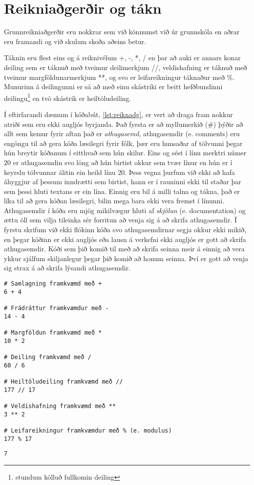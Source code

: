 \section{Reikniaðgerðir og tákn}\label{uk:tolur-reiknivirkjar}
Grunnreikniaðgerðir eru nokkrar sem við könnumst við úr grunnskóla en aðrar eru framandi og við skulum skoða aðeins betur.

Táknin eru flest eins og á reiknivélum +, -, *, / en þar að auki er annars konar deiling sem er táknuð með tveimur deilimerkjum //, veldishafning er táknuð með tveimur margföldunarmerkjum **, og svo er leifareikningur táknaður með \%.
Munurinn á deilingunni er sá að með einu skástriki er beitt hefðbundinni deilingu\footnote{stundum kölluð fullkomin deiling} en tvö skástrik er heiltöludeiling.

Í eftirfarandi dæmum í kóðabút, \ref{lst:reiknadg}, er vert að draga fram nokkur atriði sem eru ekki augljós byrjanda. 
Það fyrsta er að myllumerkið (\#) þýðir að allt sem kemur fyrir aftan það er \textit{athugasemd}, athugasemdir (e. comments) eru engöngu til að gera kóða læsilegri fyrir fólk, þær eru hunsaðar af tölvunni þegar hún breytir kóðanum í eitthvað sem hún skilur.
Eins og sést í línu merktri númer 20 er athugasemdin svo löng að hún birtist okkur sem tvær línur en hún er í keyrslu tölvunnar álitin ein heild línu 20.
Þess vegna þurfum við ekki að hafa áhyggjur af þessum inndrætti sem birtist, hann er í rauninni ekki til staðar þar sem þessi hluti textans er ein lína.
Einnig eru bil á milli talna og tákna, það er líka til að gera kóðan læsilegri, bilin mega bara ekki vera fremst í línunni.
Athugasemdir í kóða eru mjög mikilvægur hluti af \emph{skjölun} (e. documentation) og ættu öll sem vilja tileinka sér forritun að venja sig á að skrifa athugasemdir.
Í fyrstu skrifum við ekki flókinn kóða svo athugasemdirnar segja okkur ekki mikið, en þegar kóðinn er ekki augljós eða lausn á verkefni ekki augljós er gott að skrifa athugasemdir.
Kóði sem þið komið til með að skrifa seinna meir á einnig að vera ykkur sjálfum skiljanlegur þegar þið komið að honum seinna.
Því er gott að venja sig strax á að skrifa lýsandi athugasemdir. 

\begin{lstlisting}[caption=Reikniaðgerðir, label=lst:reiknadg]
# Samlagning framkvæmd með + 
6 + 4 

# Frádráttur framkvæmdur með -
14 - 4 

# Margföldun framkvæmd með * 
10 * 2 

# Deiling framkvæmd með / 
60 / 6 

# Heiltöludeiling framkvæmd með //
177 // 17

# Veldishafning framkvæmd með **
3 ** 2

# Leifareikningur framkvæmdur með % (e. modulus)
177 % 17
\end{lstlisting}
\lstset{style=uttak}
\begin{lstlisting}
7
\end{lstlisting}
\lstset{style=venjulegt}

